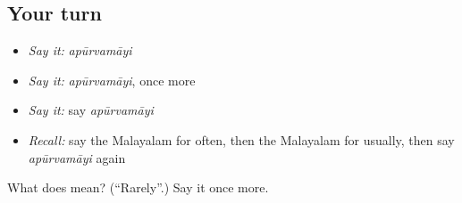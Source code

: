 \subsection*{Your turn}
\begin{itemize}
\raggedright
  \item \emph{Say it:} \emph{apūrvamāyi}
  \item \emph{Say it:} \emph{apūrvamāyi}, once more
  \item \emph{Say it:} say \emph{apūrvamāyi}
  \item \emph{Recall:} say the Malayalam for often, then the Malayalam for usually, then say \emph{apūrvamāyi} again
\end{itemize}

\begin{tcolorbox}[breakable,colback=teal!4,colframe=teal!35!black,title={Before you move on}]
What does  mean? (\textquotedblleft{}Rarely\textquotedblright{}.) Say it once more.
\end{tcolorbox}
